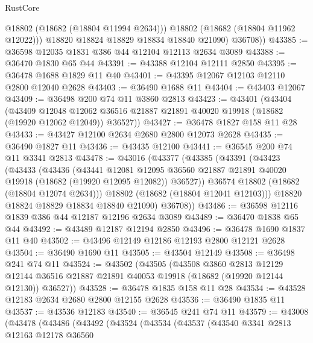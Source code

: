 \begin{lexlean}{RustCore}
\begin{coremodule}
              @18802
              (@18682 (@18804 @11994 @2634)))
            @18802
            (@18682 (@18804 @11962 @12022)))
          @18820
          @18824
          @18829
          @18834
          @18840
          @21090)
        @36708))
@43385 := @36598 @12035 @1831 @386 @44 @12104 @12113 @2634 @3089
@43388 := @36470 @1830 @65 @44
@43391 := @43388 @12104 @12111 @2850
@43395 := @36478 @1688 @1829 @11 @40
@43401 := @43395 @12067 @12103 @12110 @2800 @12040 @2628
@43403 := @36490 @1688 @11
@43404 := @43403 @12067
@43409 := @36498 @200 @74 @11 @3860 @2813
@43423 := @43401
    (@43404
      (@43409
        @12048
        @12062
        @36516
        @21887
        @21891
        @40020
        @19918
        (@18682 (@19920 @12062 @12049))
        @36527))
@43427 := @36478 @1827 @158 @11 @28
@43433 := @43427 @12100 @2634 @2680 @2800 @12073 @2628
@43435 := @36490 @1827 @11
@43436 := @43435 @12100
@43441 := @36545 @200 @74 @11 @3341 @2813
@43478 := @43016
    (@43377
      (@43385
        (@43391
          (@43423
            (@43433
              (@43436
                (@43441
                  @12081
                  @12095
                  @36560
                  @21887
                  @21891
                  @40020
                  @19918
                  (@18682 (@19920 @12095 @12082))
                  @36527))
              @36574
              @18802
              (@18682 (@18804 @12074 @2634)))
            @18802
            (@18682 (@18804 @12041 @12103)))
          @18820
          @18824
          @18829
          @18834
          @18840
          @21090)
        @36708))
@43486 := @36598 @12116 @1839 @386 @44 @12187 @12196 @2634 @3089
@43489 := @36470 @1838 @65 @44
@43492 := @43489 @12187 @12194 @2850
@43496 := @36478 @1690 @1837 @11 @40
@43502 := @43496 @12149 @12186 @12193 @2800 @12121 @2628
@43504 := @36490 @1690 @11
@43505 := @43504 @12149
@43508 := @36498 @241 @74 @11
@43524 := @43502
    (@43505
      (@43508
        @3860
        @2813
        @12129
        @12144
        @36516
        @21887
        @21891
        @40053
        @19918
        (@18682 (@19920 @12144 @12130))
        @36527))
@43528 := @36478 @1835 @158 @11 @28
@43534 := @43528 @12183 @2634 @2680 @2800 @12155 @2628
@43536 := @36490 @1835 @11
@43537 := @43536 @12183
@43540 := @36545 @241 @74 @11
@43579 := @43008
    (@43478
      (@43486
        (@43492
          (@43524
            (@43534
              (@43537
                (@43540
                  @3341
                  @2813
                  @12163
                  @12178
                  @36560

\end{coremodule}
\end{lexlean}
